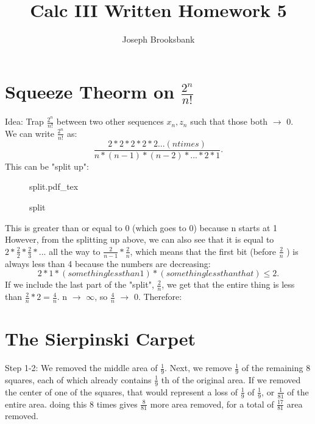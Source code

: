 \documentclass[12pt]{article}
\title{Calc III Written Homework 5}
\author{Joseph Brooksbank}
\newcommand{\incfig}[1]{%
    \def\svgwidth{\columnwidth}
    {#1.pdf_tex}
}
\begin{document}
\maketitle

\section{Squeeze Theorm on $\frac{2^{n}}{n!}$ }

Idea: Trap $\frac{2^{n}}{n!}$ between two other sequences $x_n,z_n$ such that those both $\to$ 0. 
\\
We can write $\frac{2^{n}}{n!}$ as:
\[
        \frac{2*2*2*2*2...(n times)}{n*(n-1)*(n-2)*...*2*1}
.\] 
This can be "split up": 

\begin{figure}[ht]
    \centering
    \incfig{split}
    \caption{split}
    \label{fig:split}
\end{figure}

This is greater than or equal to 0 (which goes to 0) because n starts at 1
\\
However, from the splitting up above, we can also see that it is equal to $2 * \frac{2}{2} * \frac{2}{3} *...$ all the way to $\frac{2}{n-1} * \frac{2}{n}$, which means that the first bit (before $\frac{2}{n}$ ) is always less than 4 because the numbers are decreasing:
\[
        2*1*(something less than 1) * (something less than that) \leq 2
.\] 
If we include the last part of the "split", $\frac{2}{n}$, we get that the entire thing is less than $\frac{2}{n} * 2 = \frac{4}{n}$. n $\to$ $\infty$, so $\frac{4}{n}$ $\to$ 0. Therefore:

\section{The Sierpinski Carpet}

Step 1-2: We removed the middle area of $\frac{1}{9}$. Next, we remove $\frac{1}{9}$ of the remaining 8 squares, each of which already contains $\frac{1}{9}$ th of the original area. If we removed the center of one of the squares, that would represent a loss of $\frac{1}{9}$ of $\frac{1}{9}$, or $\frac{1}{81}$ of the entire area. doing this 8 times gives $\frac{8}{81}$ more area removed, for a total of $\frac{17}{81}$ area removed. 
\\
\end{document}
